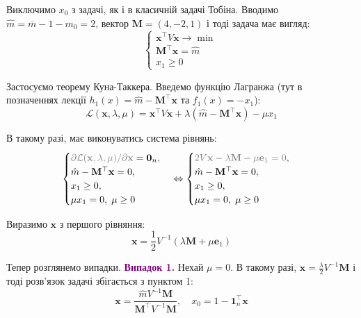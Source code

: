 \documentclass{test_template}
\begin{document}
Виключимо $x_0$ з задачі, як і в класичній задачі Тобіна. Вводимо $\hat{m} = \overline{m}-1-m_0=2$, 
вектор $\mathbf{M} = (4,-2,1)$ і тоді задача має вигляд:
\begin{equation*}
    \begin{cases}
        \mathbf{x}^{\top}V\mathbf{x} \to \min \\
        \mathbf{M}^{\top}\mathbf{x} = \hat{m} \\
        x_1 \geq 0
    \end{cases}
\end{equation*}

Застосуємо теорему Куна-Таккера. Введемо функцію Лагранжа (тут в позначеннях лекції 
$h_1(x) = \hat{m}- \mathbf{M}^{\top}\mathbf{x}$ та $f_1(x) = -x_1$):
\begin{equation*}
    \mathcal{L}(\mathbf{x},\lambda,\mu) = \mathbf{x}^{\top}V\mathbf{x} + \lambda(\hat{m} - \mathbf{M}^{\top}\mathbf{x}) - \mu x_1
\end{equation*}

В такому разі, має виконуватись система рівнянь:
\begin{equation*}
    \begin{cases}
        \textcolor{gray}{\partial \mathcal{L}(\mathbf{x},\lambda,\mu)/\partial\mathbf{x}} = \mathbf{0}_n, \\
        \hat{m}- \mathbf{M}^{\top}\mathbf{x} = 0, \\
        x_1 \geq 0, \\
        \mu x_1 = 0, \; \mu \geq 0
    \end{cases} \iff \begin{cases}
        \textcolor{gray}{2V\mathbf{x} - \lambda\mathbf{M} - \mu\mathbf{e}_1 = 0}, \\
        \hat{m}- \mathbf{M}^{\top}\mathbf{x} = 0, \\
        x_1 \geq 0, \\
        \mu x_1 = 0, \; \mu \geq 0
    \end{cases}
\end{equation*}

Виразимо $\mathbf{x}$ з першого рівняння:
\begin{equation*}
    \mathbf{x} = \frac{1}{2}V^{-1}\left(\lambda \mathbf{M} + \mu \mathbf{e}_1\right)
\end{equation*}

Тепер розглянемо випадки. \textcolor{purple}{\textbf{Випадок 1.}} Нехай $\mu=0$. В такому разі, $\mathbf{x} = \frac{\lambda}{2}V^{-1}\mathbf{M}$
і тоді розв'язок задачі збігається з пунктом 1:
\begin{equation*}
    \mathbf{x} = \frac{\hat{m}V^{-1}\mathbf{M}}{\mathbf{M}^{\top}V^{-1}\mathbf{M}}, \quad x_0 = 1 - \mathbf{1}_n^{\top}\mathbf{x}
\end{equation*}
\end{document}
